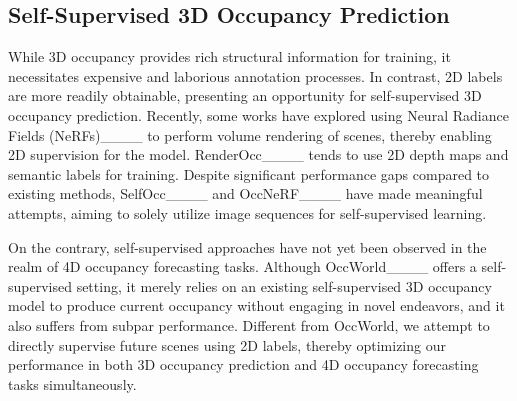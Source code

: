 \subsection{Self-Supervised 3D Occupancy Prediction}

While 3D occupancy provides rich structural information for training, it necessitates expensive and laborious annotation processes. In contrast, 2D labels are more readily obtainable, presenting an opportunity for self-supervised 3D occupancy prediction. Recently, some works have explored using Neural Radiance Fields (NeRFs)____ to perform volume rendering of scenes, thereby enabling 2D supervision for the model. RenderOcc____ tends to use 2D depth maps and semantic labels for training. Despite significant performance gaps compared to existing methods, SelfOcc____ and OccNeRF____ have made meaningful attempts, aiming to solely utilize image sequences for self-supervised learning.

On the contrary, self-supervised approaches have not yet been observed in the realm of 4D occupancy forecasting tasks. Although OccWorld____ offers a self-supervised setting, it merely relies on an existing self-supervised 3D occupancy model to produce current occupancy without engaging in novel endeavors, and it also suffers from subpar performance. Different from OccWorld, we attempt to directly supervise future scenes using 2D labels, thereby optimizing our performance in both 3D occupancy prediction and 4D occupancy forecasting tasks simultaneously.
